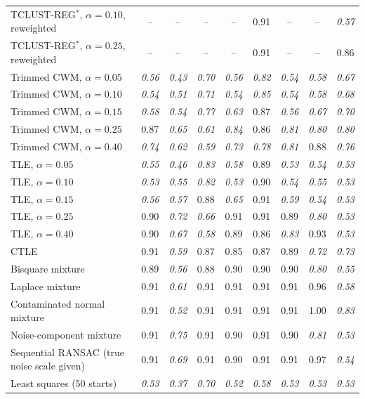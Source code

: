 \begin{table}[htbp]
{\begin{tabular}{lcccccccc}
TCLUST-REG$^{\ast}$, $\alpha=0.10$, reweighted & -- & -- & -- & -- & 0.91 & -- & -- & \textit{0.57} \\
TCLUST-REG$^{\ast}$, $\alpha=0.25$, reweighted & -- & -- & -- & -- & 0.91 & -- & -- & 0.86 \\
\addlinespace
Trimmed CWM, $\alpha=0.05$ & \textit{0.56} & \textit{0.43} & \textit{0.70} & \textit{0.56} & \textit{0.82} & \textit{0.54} & \textit{0.58} & \textit{0.67} \\
Trimmed CWM, $\alpha=0.10$ & \textit{0.54} & \textit{0.51} & \textit{0.71} & \textit{0.54} & \textit{0.85} & \textit{0.54} & \textit{0.58} & \textit{0.68} \\
Trimmed CWM, $\alpha=0.15$ & \textit{0.58} & \textit{0.54} & \textit{0.77} & \textit{0.63} & 0.87 & \textit{0.56} & \textit{0.67} & \textit{0.70} \\
Trimmed CWM, $\alpha=0.25$ & 0.87 & \textit{0.65} & \textit{0.61} & \textit{0.84} & 0.86 & \textit{0.81} & \textit{0.80} & \textit{0.80} \\
Trimmed CWM, $\alpha=0.40$ & \textit{0.74} & \textit{0.62} & \textit{0.59} & \textit{0.73} & \textit{0.78} & \textit{0.81} & 0.88 & \textit{0.76} \\
\addlinespace
TLE, $\alpha=0.05$ & \textit{0.55} & \textit{0.46} & \textit{0.83} & \textit{0.58} & 0.89 & \textit{0.53} & \textit{0.54} & \textit{0.53} \\
TLE, $\alpha=0.10$ & \textit{0.53} & \textit{0.55} & \textit{0.82} & \textit{0.53} & 0.90 & \textit{0.54} & \textit{0.55} & \textit{0.53} \\
TLE, $\alpha=0.15$ & \textit{0.56} & \textit{0.57} & 0.88 & \textit{0.65} & 0.91 & \textit{0.59} & \textit{0.54} & \textit{0.53} \\
TLE, $\alpha=0.25$ & 0.90 & \textit{0.72} & \textit{0.66} & 0.91 & 0.91 & 0.89 & \textit{0.80} & \textit{0.53} \\
TLE, $\alpha=0.40$ & 0.90 & \textit{0.67} & \textit{0.58} & 0.89 & 0.86 & \textit{0.83} & 0.93 & \textit{0.53} \\
\addlinespace
CTLE & 0.91 & \textit{0.59} & 0.87 & 0.85 & 0.87 & 0.89 & \textit{0.72} & \textit{0.73} \\
Bisquare mixture & 0.89 & \textit{0.56} & 0.88 & 0.90 & 0.90 & 0.90 & \textit{0.80} & \textit{0.55} \\
Laplace mixture & 0.91 & \textit{0.61} & 0.91 & 0.91 & 0.91 & 0.91 & 0.96 & \textit{0.58} \\
Contaminated normal mixture & 0.91 & \textit{0.52} & 0.91 & 0.91 & 0.91 & 0.91 & 1.00 & \textit{0.83} \\
Noise-component mixture & 0.91 & \textit{0.75} & 0.91 & 0.90 & 0.91 & 0.90 & \textit{0.81} & \textit{0.53} \\
\addlinespace
Sequential RANSAC (true noise scale given) & 0.91 & \textit{0.69} & 0.91 & 0.90 & 0.91 & 0.91 & 0.97 & \textit{0.54} \\
Least squares (50 starts) & \textit{0.53} & \textit{0.37} & \textit{0.70} & \textit{0.52} & \textit{0.58} & \textit{0.53} & \textit{0.53} & \textit{0.53} \\
\bottomrule
\end{tabular}}
\end{table}